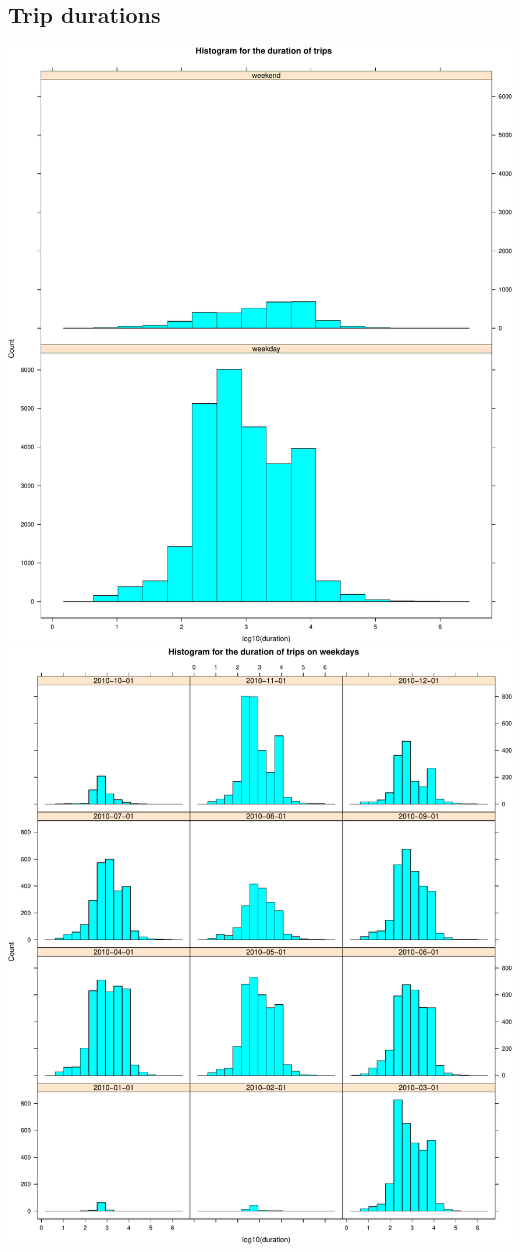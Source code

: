\documentclass[]{article}
\begin{document}
\subsection{Trip durations}\label{trip-durations}

\includegraphics{velopassBirdsEye_files/figure-latex/tripdurations-1.pdf}
\includegraphics{velopassBirdsEye_files/figure-latex/tripdurations-2.pdf}
\end{document}

